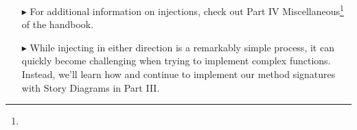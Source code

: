 \begin{itemize}
\item[$\blacktriangleright$] For additional information on injections, check out Part IV Miscellaneous\footnote{\downLink} of the handbook.

\vspace{0.5cm}

\item[$\blacktriangleright$] While injecting in either direction is a remarkably simple process, it can quickly become challenging when trying to implement
complex functions. Instead, we'll learn how and continue to implement our method signatures with Story Diagrams in Part III.

 
\end{itemize}

